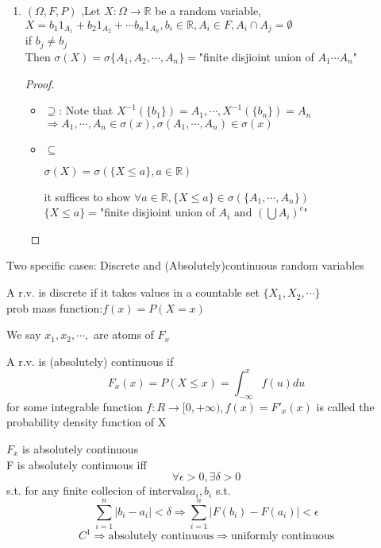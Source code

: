 \begin{example}[]{}
 \begin{enumerate}[label=\circled{\arabic*}] 
 \item $(\Omega,F,P)$ ,Let $ X:\Omega\rightarrow\mathbb{R} $ be a random variable, $ X=b_1 1_{A_1}+ b_2 1_{A_2}+\cdots b_n 1_{A_n},b_i\in\mathbb{R},A_i\in F ,A_i\cap A_j=\emptyset $
 \\if $ b_j\neq b_j $\\ Then $ \sigma(X)=\sigma\{A_1,A_2,\cdots,A_n\} =$"finite disjioint union of $ A_1\cdots A_n $"
 \begin{proof}
    \begin{itemize}
    \item $ \supseteq $: Note that $ X^{-1}(\{b_1\})=A_1, \cdots, X^{-1}(\{b_n\})=A_n$ 
    \\$ \Rightarrow A_1,\cdots, A_n\in\sigma(x),\sigma(A_1,\cdots, A_n)\in\sigma(x) $ 
    \item $ \subseteq $  \begin{lemma}[]{}
        $ \sigma(X)=\sigma(\{X\leq a\},a\in \mathbb{R}) $ 
        \end{lemma}
    it suffices to show $ \forall a\in \mathbb{R},\{X\leq a\}\in \sigma(\{A_1,\cdots,A_n\}) $
    \\$ \{X\leq a\}= $"finite disjioint union of $ A_i \text{ and }(\bigcup A_i)^c$" 
    \end{itemize}
 \end{proof}
 \end{enumerate}
\end{example}
Two specific cases: Discrete and (Absolutely)continuous random variables
\begin{definition}[]{}
A r.v. is discrete if it takes values in a countable set $ \{X_1,X_2,\cdots\} $
\\prob mass function:$ f(x)=P(X=x) $
\end{definition}
\begin{remark}[]{}
We say $ x_1,x_2,\cdots, $ are atoms of $ F_x $  
\end{remark}
\begin{definition}[]{}
A r.v. is (absolutely) continuous if $$
    F_x(x)=P(X\leq x)=\int_{-\infty}^{x}f(u)du
$$ for some integrable function $ f:R\rightarrow [0,+\infty),f(x)=F'_x(x) $ is called the probability density function of X
\end{definition}
\begin{remark}[]{}
$ F_x $ is absolutely continuous 
\\F is absolutely continuous iff $$ \forall \epsilon>0,\exists \delta>0 $$ s.t. for any finite collecion of intervals$ a_i,b_i $ s.t. $$ \sum_{i=1}^{n}|b_i-a_i|<\delta \Rightarrow \sum_{i=1}^{n}|F(b_i)-F(a_i)|<\epsilon $$
$$
    C^1\Rightarrow \text{absolutely continuous}\Rightarrow \text{uniformly continuous}
$$ 
\end{remark}
